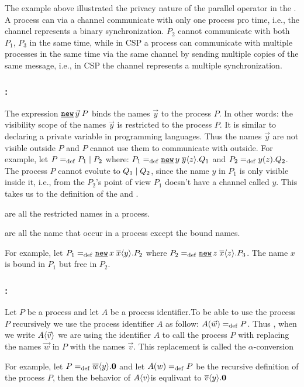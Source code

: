 The example above illustrated the privacy nature of the parallel operator in the \picalc{}. A process can via a channel communicate with only one process pro time, i.e., the channel represents a binary synchronization. $P_2$ cannot communicate with both $P_1$, $P_3$ in the same time, while in \gls{CSP} a process can communicate with multiple processes in the same time via the same channel by sending multiple copies of the same message, i.e., in CSP the channel represents a multiple synchronization.


\subsubsection{:}

The expression $\procres{\vec{y}}{P}$ binds the names $\vec{y}$ to the process $P$. In other words: the visibility scope of the  names $\vec{y}$ is restricted to the process $P$. It is similar to declaring a private variable in programming languages. Thus the names $\vec{y}$ are not visible outside $P$ and $P$ cannot use them to communicate with outside. For example, let $P=_{\mathrm{def}}P_1 \mid P_2$ where: $P_1\define\procres{y}{\out{y}{z}.Q_1}$ and $P_2=_{\mathrm{def}}y(z).Q_2$. The process $P$ cannot evolute to $Q_1 \mid Q_2$, since the name $y$ in $P_1$ is only visible inside it, i.e., from the $P_2$'s point of view $P_1$ doesn't have a channel called $y$. This takes us to the definition of the 
and 
.

\begin{definition}
\label{def_bound_names}
 are all the restricted names in a process.
\end{definition}
\begin{definition}
\label{def_free_names}
 are all the name that occur in a process except the bound names.
\end{definition}

For example, let $P_1\define\procres{x}{\out{x}{y}.P_2}$ where $P_2\define\procres{z}{\out{x}{z}.P_3}$. The name $x$ is bound in $P_1$ but free in $P_2$.


\subsubsection{:}
\label{subsubsection_process_call}

Let $P$ be a process and let $A$ be a process identifier.To be able to use the process $P$ recursively we use the process identifier $A$ as follow: $A(\vec{w})=_{\mathrm{def}}{}P$. Thus , when we write $A\langle\vec{v}\rangle$ we are using the identifier $A$ to call the process $P$ with replacing the names $\vec{w}$ in $P$ with the names $\vec{v}$. This replacement is called the $\alpha$-conversion

For example, let $P=_{\mathrm{def}}\overline{w}\langle y\rangle.\mathbf{0}$ and let $A(w)=_{\mathrm{def}}{}P$ be the recursive definition of the process $P$, then the behavior of $A\langle v\rangle$is equlivant to $\overline{v}\langle y\rangle.\mathbf{0}$ 


